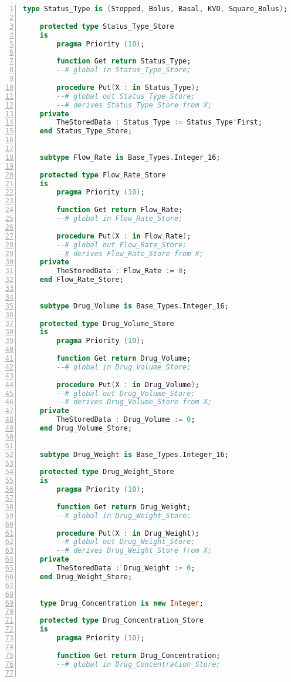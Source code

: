 \begin{lstlisting}[language=ada, gobble=0, numbers=left, caption={\lstinline{Pca_Types} package}, label={listing:pca_generated:pca_types}]
    type Status_Type is (Stopped, Bolus, Basal, KVO, Square_Bolus);

    protected type Status_Type_Store
    is
        pragma Priority (10);

        function Get return Status_Type;
        --# global in Status_Type_Store;

        procedure Put(X : in Status_Type);
        --# global out Status_Type_Store;
        --# derives Status_Type_Store from X;
    private
        TheStoredData : Status_Type := Status_Type'First;
    end Status_Type_Store;


    subtype Flow_Rate is Base_Types.Integer_16;

    protected type Flow_Rate_Store
    is
        pragma Priority (10);

        function Get return Flow_Rate;
        --# global in Flow_Rate_Store;

        procedure Put(X : in Flow_Rate);
        --# global out Flow_Rate_Store;
        --# derives Flow_Rate_Store from X;
    private
        TheStoredData : Flow_Rate := 0;
    end Flow_Rate_Store;


    subtype Drug_Volume is Base_Types.Integer_16;

    protected type Drug_Volume_Store
    is
        pragma Priority (10);

        function Get return Drug_Volume;
        --# global in Drug_Volume_Store;

        procedure Put(X : in Drug_Volume);
        --# global out Drug_Volume_Store;
        --# derives Drug_Volume_Store from X;
    private
        TheStoredData : Drug_Volume := 0;
    end Drug_Volume_Store;


    subtype Drug_Weight is Base_Types.Integer_16;

    protected type Drug_Weight_Store
    is
        pragma Priority (10);

        function Get return Drug_Weight;
        --# global in Drug_Weight_Store;

        procedure Put(X : in Drug_Weight);
        --# global out Drug_Weight_Store;
        --# derives Drug_Weight_Store from X;
    private
        TheStoredData : Drug_Weight := 0;
    end Drug_Weight_Store;


    type Drug_Concentration is new Integer;

    protected type Drug_Concentration_Store
    is
        pragma Priority (10);

        function Get return Drug_Concentration;
        --# global in Drug_Concentration_Store;


\end{lstlisting}
